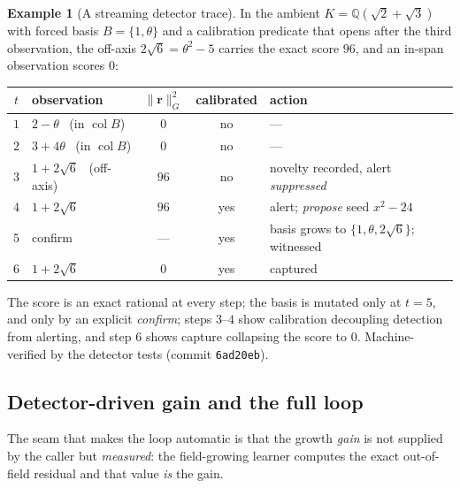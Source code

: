 \documentclass[11pt]{article}
\theoremstyle{plain}
\theoremstyle{definition}
\newtheorem{example}[theorem]{Example}
\theoremstyle{remark}
\newcommand{\Q}{\mathbb{Q}}
\newcommand{\K}{K}
\newcommand{\rr}{\mathbf{r}}
\newcommand{\GG}{G}
\newcommand{\BB}{B}
\DeclareMathOperator{\col}{col}
\begin{document}
\begin{example}[A streaming detector trace]\label{ex:stream}
In the ambient $\K=\Q(\sqrt2+\sqrt3)$ with forced basis $\BB=\{1,\theta\}$ and a calibration predicate that
opens after the third observation, the off-axis $2\sqrt6=\theta^2-5$ carries the exact score $96$, and an
in-span observation scores $0$:
\begin{center}
\begin{tabular}{clccl}
\toprule
$t$ & observation & $\lVert\rr\rVert_\GG^2$ & calibrated & action \\
\midrule
$1$ & $2-\theta$ \ (in $\col\BB$)   & $0$  & no  & --- \\
$2$ & $3+4\theta$ \ (in $\col\BB$)  & $0$  & no  & --- \\
$3$ & $1+2\sqrt6$ \ (off-axis)      & $96$ & no  & novelty recorded, alert \emph{suppressed} \\
$4$ & $1+2\sqrt6$                   & $96$ & yes & alert; \emph{propose} seed $x^2-24$ \\
$5$ & confirm                       & ---  & yes & basis grows to $\{1,\theta,2\sqrt6\}$; witnessed \\
$6$ & $1+2\sqrt6$                   & $0$  & yes & captured \\
\bottomrule
\end{tabular}
\end{center}
The score is an exact rational at every step; the basis is mutated only at $t=5$, and only by an explicit
\emph{confirm}; steps $3$--$4$ show calibration decoupling detection from alerting, and step $6$ shows capture
collapsing the score to $0$. Machine-verified by the detector tests (commit \texttt{6ad20eb}).
\end{example}

\subsection{Detector-driven gain and the full loop}
The seam that makes the loop automatic is that the growth \emph{gain} is not supplied by the caller but
\emph{measured}: the field-growing learner computes the exact out-of-field residual and that value \emph{is}
the gain.
\end{document}
